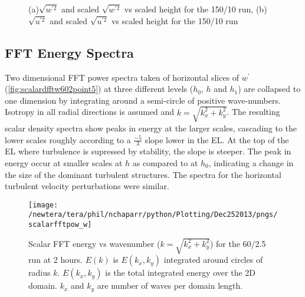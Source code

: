 \begin{figure}[htbp]
\begin{minipage}[b]{0.5\linewidth}
        \\
        \end{minipage}             
\quad
\begin{minipage}[b]{0.5\linewidth}
        \\
       
       \end{minipage}
        \caption{(a)$\sqrt{w^{'2}}$ and scaled $\sqrt{w^{'2}}$ vs scaled height for the 150/10 run, (b) $\sqrt{u^{'2}}$ and scaled $\sqrt{u^{'2}}$ vs scaled height for the 150/10 run}
        \label{fig:rssfitshigh}
\end{figure}

\clearpage

\subsection{FFT Energy Spectra}
\FloatBarrier

Two dimensional \acs{FFT} power spectra taken of horizontal slices of $w^{\prime}$ (\ref{fig:scalardfftw602point5}) at three
different levels ($h_{0}$, $h$ and $h_{1}$) are collapsed to one dimension by integrating around a semi-circle of positive wave-numbers.
Isotropy in all radial directions is assumed and $k = \sqrt{k_{x}^{2} + k_{y}^{2}}$.  The resulting scalar density spectra show peaks in 
energy at the larger scales, cascading to the lower scales roughly according to a $\frac{-5}{3}$ slope lower in the \acs{EL}.  At
the top of the \acs{EL} where turbulence is supressed by stability, the slope is steeper.  The peak in energy occur at smaller scales
at $h$ as compared to at $h_{0}$, indicating a change in the size of the dominant turbulent structures. The spectra for the horizontal
turbulent velocity perturbations were similar.\\

\begin{figure}[htbp]
    \centering
    \texttt{[image: /newtera/tera/phil/nchaparr/python/Plotting/Dec252013/pngs/scalarfftpow\_w]}
    \caption{Scalar FFT  energy vs wavenumber ($k = \sqrt{k_{x}^{2}+k_{y}^{2}}$) for the 60/2.5 run
at 2 hours.  $E(k)$ is $E(k_{x}, k_{y})$ integrated around circles of radius $k$.  
   $E(k_{x}, k_{y})$ is the total integrated energy over the 2D domain.  
   $k_{x}$ and $k_{y}$ are number of waves per domain length.}
   \label{fig:2fftw602point5}   %
\end{figure}

